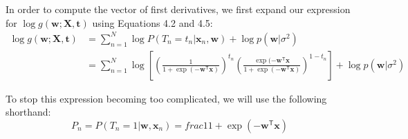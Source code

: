 In order to compute the vector of first derivatives, we first expand our expression
for $\log g(\mathbf{w}; \mathbf{X}, \mathbf{t})$
using Equations 4.2 and 4.5:
\begin{align*}
\log g(\mathbf{w}; \mathbf{X}, \mathbf{t}) & =
\sum_{n=1}^{N} \log P(T_n = t_n | \mathbf{x}_n, \mathbf{w}) + \log p(\mathbf{w} | \sigma^2) \\
& = \sum_{n=1}^{N} \log \left[
\left(
\frac{1}{1 + \exp( -\mathbf{w}^{\mathsf{T}} \mathbf{x} )}
\right)^{t_n}
\left(
\frac{\exp( -\mathbf{w}^{\mathsf{T}} \mathbf{x}}{1 + \exp( -\mathbf{w}^{\mathsf{T}} \mathbf{x} )}
\right)^{1 - t_n}
\right] + \log p(\mathbf{w} | \sigma^2)
\end{align*}

To stop this expression becoming too complicated, we will use the following shorthand:
\begin{equation*}
P_{n} = P(T_n = 1 | \mathbf{w}, \mathbf{x}_n) = 
frac{1}{1 + \exp( -\mathbf{w}^{\mathsf{T}} \mathbf{x} )}
\end{equation*}